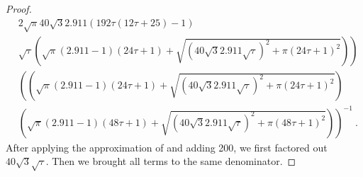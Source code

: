 \documentclass{article}
\begin{document}
\begin{proof}
\begin{align}
&\left.2 \sqrt{\pi } 40 \sqrt{3} 2.911 (192  \tau (12  \tau+25)-1) \right.\\\nonumber 
&\left. \sqrt{\tau} \left(\sqrt{\pi } (2.911 -1) (24 \tau+1)+\sqrt{\left(40 \sqrt{3} 2.911 \sqrt{\tau}\right)^2+\pi  (24 \tau+1)^2}\right)\right)\\ \nonumber 
&\left(\left(\sqrt{\pi } (2.911 -1) (24 \tau+1)+\sqrt{\left(40 \sqrt{3} 2.911 \sqrt{\tau}\right)^2+\pi  (24 \tau+1)^2}\right) \right.\\\nonumber 
&\left.  \left(\sqrt{\pi } (2.911 -1) (48 \tau+1)+\sqrt{\left(40 \sqrt{3} 2.911 \sqrt{\tau}\right)^2+\pi  (48 \tau+1)^2}\right)\right)^{-1} \ .
\end{align}
After applying the approximation
of \citet{Ren:07} and adding 200,
we first factored out $40 \sqrt{3} \sqrt{\tau}$.
Then we brought all terms to the same denominator.


\end{proof}
\end{document}
